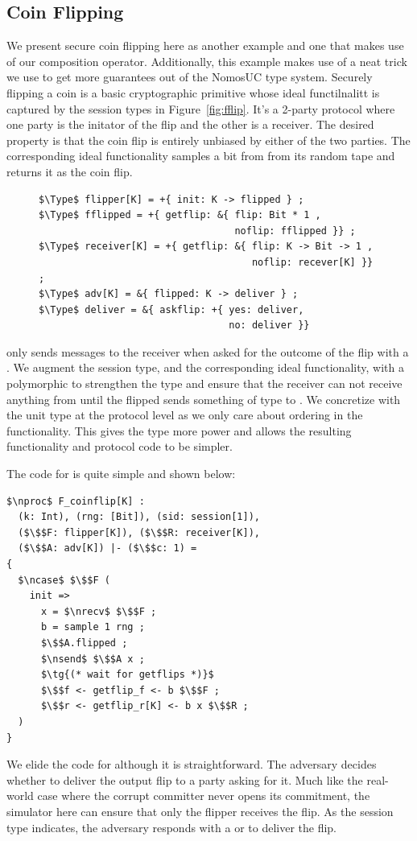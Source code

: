 \subsection{Coin Flipping}
We present secure coin flipping here as another example and one that makes use of our composition operator. 
Additionally, this example makes use of a neat trick we use to get more guarantees out of the NomosUC type system.
Securely flipping a coin is a basic cryptographic primitive whose ideal functilnalitt \Fflip is captured by the session types in Figure~\ref{fig:fflip}.
It's a 2-party protocol where one party is the initator of the flip and the other is a receiver.
The desired property is that the coin flip is entirely unbiased by either of the two parties. The corresponding ideal functionality \Fflip samples a bit from from its random tape and returns it as the coin flip.
\begin{figure}
\centering
\begin{lstlisting}[basicstyle=\footnotesize\BeraMonottFamily, frame=single, mathescape]
$\Type$ flipper[K] = +{ init: K -> flipped } ;
$\Type$ fflipped = +{ getflip: &{ flip: Bit * 1 ,
                                  noflip: fflipped }} ;
$\Type$ receiver[K] = +{ getflip: &{ flip: K -> Bit -> 1 ,
                                     noflip: recever[K] }} ;
$\Type$ adv[K] = &{ flipped: K -> deliver } ;
$\Type$ deliver = &{ askflip: +{ yes: deliver,
                                 no: deliver }}
\end{lstlisting}
\end{figure}

\Fflip only sends messages to the receiver when asked for the outcome of the flip with a . 
We augment the session type, and the corresponding ideal functionality, with a polymorphic  to strengthen the type and ensure that the receiver can not receive anything from  until the flipped sends something of type  to \Fflip.
We concretize  with the unit type \inline{()} at the protocol level as we only care about ordering in the functionality. 
This gives the type more power and allows the resulting functionality and protocol code to be simpler. 

The code for \Fflip is quite simple and shown below:
\begin{lstlisting}[basicstyle=\footnotesize\BeraMonottFamily, frame=single, mathescape]
$\nproc$ F_coinflip[K] :
  (k: Int), (rng: [Bit]), (sid: session[1]),
  ($\$$F: flipper[K]), ($\$$R: receiver[K]),
  ($\$$A: adv[K]) |- ($\$$c: 1) =
{
  $\ncase$ $\$$F (
    init =>
      x = $\nrecv$ $\$$F ;
      b = sample 1 rng ;
      $\$$A.flipped ;
      $\nsend$ $\$$A x ;
	  $\tg{(* wait for getflips *)}$
      $\$$f <- getflip_f <- b $\$$F ;
      $\$$r <- getflip_r[K] <- b x $\$$R ;
  )
}
\end{lstlisting}
We elide the code for  although it is straightforward. 
The adversary decides whether to deliver the output flip to a party asking for it.
Much like the real-world case where the corrupt committer never opens its commitment, the simulator here can ensure that only the flipper receives the flip.
As the session type indicates, the adversary responds with a  or  to deliver the flip.


